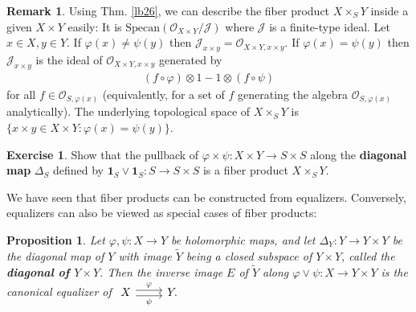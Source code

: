 \documentclass[12pt,b5paper,notitlepage]{report}
\theoremstyle{definition}
\newtheorem{exe}[df]{Exercise}
\newtheorem{rem}[df]{Remark}
\theoremstyle{plain}
\newtheorem{pp}[df]{Proposition}
\newcommand{\mc}{\mathcal}
\newcommand{\wtd}{\widetilde}
\newcommand{\id}{\mathbf{1}}
\newcommand{\scr}{\mathscr}
\newcommand{\Specan}{\mathrm{Specan}}
\numberwithin{equation}{section}
\begin{document}
\begin{rem}
Using Thm. \ref{lb26}, we can describe the fiber product $X\times_SY$ inside a given $X\times Y$ easily: It is $\Specan(\scr O_{X\times Y}/\mc J)$ where $\mc J$ is a finite-type ideal. Let $x\in X,y\in Y$. If $\varphi(x)\neq\psi(y)$ then $\mc J_{x\times y}=\scr O_{X\times Y,x\times y}$. If $\varphi(x)=\psi(y)$ then $\mc J_{x\times y}$ is the ideal of $\scr O_{X\times Y,x\times y}$ generated by
\begin{align}
(f\circ\varphi)\otimes 1-1\otimes (f\circ\psi)
\end{align}
for all $f\in\scr O_{S,\varphi(x)}$ (equivalently, for a set of $f$ generating the algebra $\scr O_{S,\varphi(x)}$ analytically). The underlying topological space of $X\times_SY$ is  $\{x\times y\in X\times Y:\varphi(x)=\psi(y)\}$.
\end{rem}

\begin{exe}
Show that the pullback of $\varphi\times\psi:X\times Y\rightarrow S\times S$ along the \textbf{diagonal map} $\Delta_S$ defined by $\id_S\vee\id_S:S\rightarrow S\times S$ is a fiber product $X\times_SY$.
\end{exe}


We have seen that fiber products can be constructed from equalizers. Conversely, equalizers can also be viewed as special cases of fiber products:

\begin{pp}
Let $\varphi,\psi:X\rightarrow Y$ be holomorphic maps, and let $\Delta_Y:Y\rightarrow Y\times Y$ be the diagonal map of $Y$ with image $\wtd Y$ being a closed subspace of $Y\times Y$, called the \textbf{diagonal of $Y\times Y$}.  Then the inverse image $E$ of $\wtd Y$ along $\varphi\vee\psi:X\rightarrow Y\times Y$ is the canonical equalizer of $\begin{tikzcd}
X\arrow[r,shift right,"\psi"']\arrow[r,shift left,"\varphi"]& Y.
\end{tikzcd}$
\end{pp}
\end{document}
